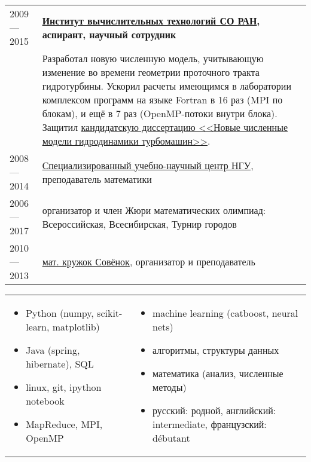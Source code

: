 \documentclass[11pt]{article}
\begin{document}
\begin{longtable} {l | p{}}
2009 — 2015 & {\textbf{\href{http://www.ict.nsc.ru}{Институт вычислительных технологий СО РАН}, аспирант, научный сотрудник}}\\

& {Разработал новую численную модель, учитывающую изменение во времени геометрии проточного тракта гидротурбины. Ускорил расчеты имеющимся в лаборатории комплексом программ на языке Fortran в 16 раз (MPI по блокам), и ещё в 7 раз (OpenMP-потоки внутри блока). Защитил \href{https://github.com/avalur/dissertation/blob/master/to_print/autoref_Avdyushenko.pdf}{кандидатскую диссертацию <<Новые численные модели гидродинамики турбомашин>>}.} \\

2008 — 2014 & {\href{http://sesc.nsu.ru}{Специализированный учебно-научный центр НГУ}, преподаватель математики}\\
2006 — 2017 & {организатор и член Жюри математических олимпиад: Всероссийская, Всесибирская, Турнир городов}\\
2010 — 2013 & {\href{https://www.sovenok.academy/}{мат. кружок Совёнок}, организатор и преподаватель}\\

\end{longtable}

\vspace{-1.0em}

\begin{longtable} {p{}p{}}
\vspace{-2.7em}
\begin{itemize}
	\item Python (numpy, scikit-learn, matplotlib)
	\item Java (spring, hibernate), SQL
	\item linux, git, ipython notebook
	\item MapReduce, MPI, OpenMP
\end{itemize}
&
\vspace{-2.7em}
\begin{itemize}
	\item machine learning (catboost, neural nets)
	\item алгоритмы, структуры данных
	\item математика (анализ, численные методы)
	\item русский: родной, английский: intermediate, французский: débutant
\end{itemize}
\\
\end{longtable}
\end{document}
